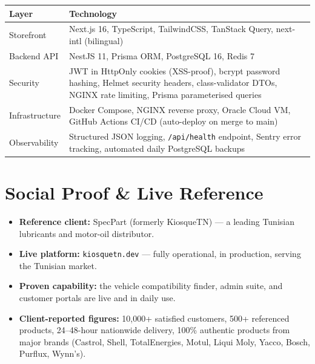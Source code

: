 \documentclass[11pt,a4paper]{article}
\begin{document}
\begin{center}
\renewcommand{\arraystretch}{1.4}
\begin{tabular}{@{}p{4cm}p{10.5cm}@{}}
\toprule
\textbf{Layer} & \textbf{Technology} \\
\midrule
Storefront    & Next.js 16, TypeScript, TailwindCSS, TanStack Query,
                next-intl (bilingual) \\
Backend API   & NestJS 11, Prisma ORM, PostgreSQL 16, Redis 7 \\
Security      & JWT in HttpOnly cookies (XSS-proof), bcrypt password
                hashing, Helmet security headers, class-validator DTOs,
                NGINX rate limiting, Prisma parameterised queries \\
Infrastructure & Docker Compose, NGINX reverse proxy, Oracle Cloud VM,
                 GitHub Actions CI/CD (auto-deploy on merge to main) \\
Observability & Structured JSON logging, \texttt{/api/health} endpoint,
                Sentry error tracking, automated daily PostgreSQL
                backups \\
\bottomrule
\end{tabular}
\end{center}

\section{Social Proof \& Live Reference}

\begin{itemize}[leftmargin=1.4em,itemsep=4pt]
  \item \textbf{Reference client:} SpecPart (formerly KiosqueTN) ---
        a leading Tunisian lubricants and motor-oil distributor.
  \item \textbf{Live platform:} \texttt{kiosquetn.dev} --- fully
        operational, in production, serving the Tunisian market.
  \item \textbf{Proven capability:} the vehicle compatibility finder,
        admin suite, and customer portals are live and in daily use.
  \item \textbf{Client-reported figures:} 10,000+ satisfied customers,
        500+ referenced products, 24--48-hour nationwide delivery,
        100\% authentic products from major brands (Castrol, Shell,
        TotalEnergies, Motul, Liqui Moly, Yacco, Bosch, Purflux,
        Wynn's).
\end{itemize}
\end{document}
